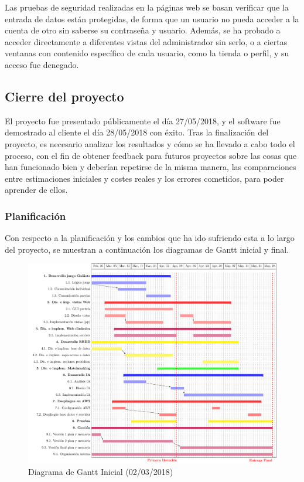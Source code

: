 Las pruebas de seguridad realizadas en la páginas web se basan verificar que la entrada de datos están protegidas, de forma que un usuario no pueda acceder a la cuenta de otro sin saberse su contraseña y usuario. Además, se ha probado a acceder directamente a diferentes vistas del administrador sin serlo, o a ciertas ventanas con contenido específico de cada usuario, como la tienda o perfil, y su acceso fue denegado. \\

\subsection{Cierre del proyecto}
\label{cierre}
El proyecto fue presentado públicamente el día 27/05/2018, y el software fue demostrado al cliente el día 28/05/2018 con éxito. Tras la finalización del proyecto, es necesario analizar los resultados y cómo se ha llevado a cabo todo el proceso, con el fin de obtener feedback para futuros proyectos sobre las cosas que han funcionado bien y deberían repetirse de la misma manera, las comparaciones entre estimaciones iniciales y costes reales y los errores cometidos, para poder aprender de ellos.

\subsubsection{Planificación}
Con respecto a la planificación y los cambios que ha ido sufriendo esta a lo largo del proyecto, se muestran a continuación los diagramas de Gantt inicial y final.\\

\begin{figure}[H]
	\centering
	\includegraphics[scale=0.6]{figuras/gantt-viejo.pdf}
	\caption{Diagrama de Gantt Inicial (02/03/2018)}
\end{figure}

